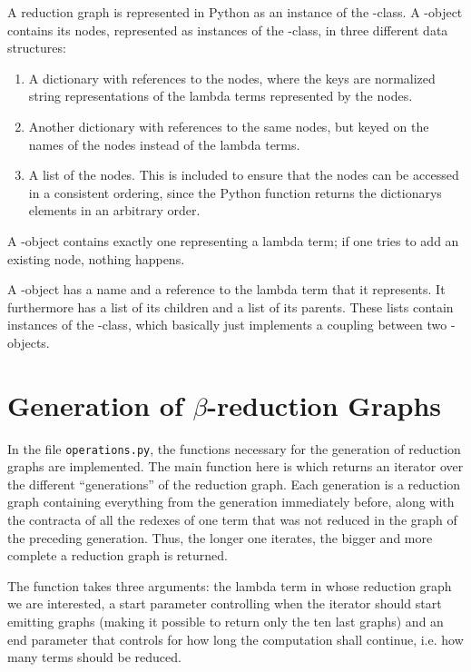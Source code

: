 A reduction graph is represented in Python as an instance of the
-class. A -object contains its nodes, represented
as instances of the -class, in three different data structures:
\begin{enumerate}
	\item A dictionary with references to the nodes, where the keys are normalized string 
	representations of the lambda terms represented by the nodes.
	
	\item Another dictionary with references to the same nodes, but keyed on the
	names of the nodes instead of the lambda terms.
	
	\item A list of the nodes. This is included to ensure that the nodes can be
	accessed in a consistent ordering, since the Python function 
	returns the dictionarys elements in an arbitrary order.
\end{enumerate}
A -object contains exactly one  representing a
lambda term; if one tries to add an existing node, nothing happens.

A -object has a name and a reference to the lambda term that it
represents. It furthermore has a list of its children and a list of its
parents. These lists contain instances of the -class, which
basically just implements a coupling between two -objects.

\section{Generation of $\beta$-reduction Graphs}

In the file \texttt{operations.py}, the functions necessary for the generation
of reduction graphs are implemented. The main function here is
 which returns an iterator over the different
``generations'' of the reduction graph. Each generation is a reduction graph
containing everything from the generation immediately before, along with the
contracta of all the redexes of one term that was not reduced in the graph of
the preceding generation. Thus, the longer one iterates, the bigger and more
complete a reduction graph is returned. 

The function takes three arguments: the lambda term in whose reduction graph
we are interested, a start parameter controlling when the iterator should
start emitting graphs (making it possible to return only the ten last graphs)
and an end parameter that controls for how long the computation shall
continue, i.e. how many terms should be reduced.

